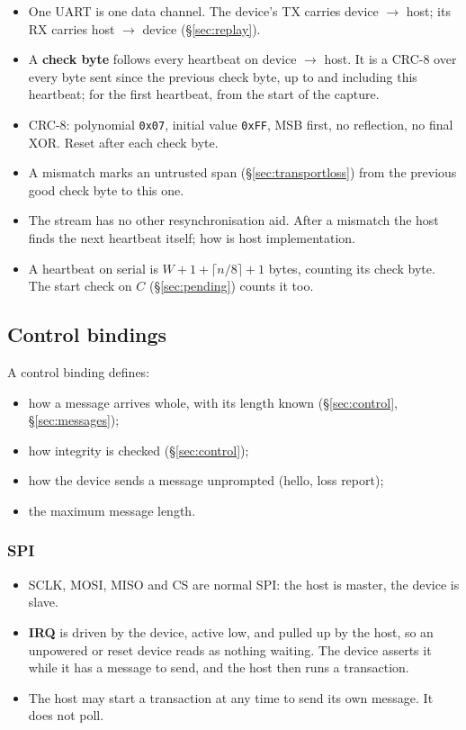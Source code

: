 \documentclass[11pt,a4paper]{article}
\newcommand{\sref}[1]{\S\ref{#1}}
\newcommand{\hex}[1]{\texttt{#1}}
\begin{document}
\begin{itemize}
  \item One UART is one data channel. The device's TX carries device $\to$ host; its
        RX carries host $\to$ device (\sref{sec:replay}).
  \item A \textbf{check byte} follows every heartbeat on device $\to$ host. It is a
        CRC-8 over every byte sent since the previous check byte, up to and including
        this heartbeat; for the first heartbeat, from the start of the capture.
  \item CRC-8: polynomial \hex{0x07}, initial value \hex{0xFF}, MSB first, no
        reflection, no final XOR. Reset after each check byte.
  \item A mismatch marks an untrusted span (\sref{sec:transportloss}) from the
        previous good check byte to this one.
  \item The stream has no other resynchronisation aid. After a mismatch the host finds
        the next heartbeat itself; how is host implementation.
  \item A heartbeat on serial is $W + 1 + \lceil n/8 \rceil + 1$ bytes, counting its
        check byte. The start check on $C$ (\sref{sec:pending}) counts it too.
\end{itemize}

\subsection{Control bindings}\label{sec:controlbindings}

A control binding defines:
\begin{itemize}
  \item how a message arrives whole, with its length known (\sref{sec:control},
        \sref{sec:messages});
  \item how integrity is checked (\sref{sec:control});
  \item how the device sends a message unprompted (hello, loss report);
  \item the maximum message length.
\end{itemize}

\subsubsection{SPI}\label{sec:spi}

\begin{itemize}
  \item SCLK, MOSI, MISO and CS are normal SPI: the host is master, the device is
        slave.
  \item \textbf{IRQ} is driven by the device, active low, and pulled up by the host,
        so an unpowered or reset device reads as nothing waiting. The device asserts
        it while it has a message to send, and the host then runs a transaction.
  \item The host may start a transaction at any time to send its own message. It does
        not poll.
\end{itemize}
\end{document}
